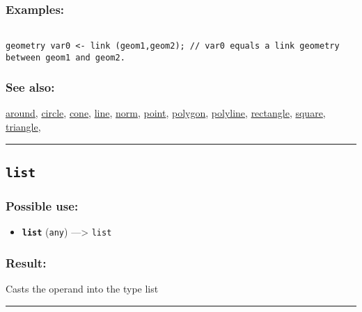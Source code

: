 \documentclass[]{book}
\providecommand{\tightlist}{%
  \setlength{\itemsep}{0pt}\setlength{\parskip}{0pt}}
\theoremstyle{definition}
\theoremstyle{definition}
\theoremstyle{definition}
\theoremstyle{remark}
\begin{document}
\subsubsection{Examples:}\label{examples-224}

\begin{verbatim}
 
geometry var0 <- link (geom1,geom2); // var0 equals a link geometry between geom1 and geom2.
\end{verbatim}

\subsubsection{See also:}\label{see-also-126}

\href{OperatorsAA\#around}{around}, \href{OperatorsBC\#circle}{circle},
\href{OperatorsBC\#cone}{cone}, \href{OperatorsIM\#line}{line},
\href{OperatorsNR\#norm}{norm}, \href{OperatorsNR\#point}{point},
\href{OperatorsNR\#polygon}{polygon},
\href{OperatorsNR\#polyline}{polyline},
\href{OperatorsNR\#rectangle}{rectangle},
\href{OperatorsSZ\#square}{square},
\href{OperatorsSZ\#triangle}{triangle},

\begin{center}\rule{0.5\linewidth}{\linethickness}\end{center}

\subsection{\texorpdfstring{\texttt{list}}{list}}\label{list}

\subsubsection{Possible use:}\label{possible-use-323}

\begin{itemize}
\tightlist
\item
  \textbf{\texttt{list}} (\texttt{any}) ---\textgreater{} \texttt{list}
\end{itemize}

\subsubsection{Result:}\label{result-313}

Casts the operand into the type list

\begin{center}\rule{0.5\linewidth}{\linethickness}\end{center}
\end{document}
